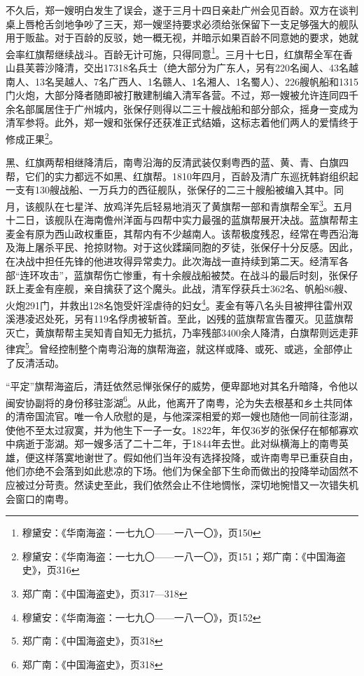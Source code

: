 不久后，郑一嫂明白发生了误会，遂于三月十四日亲赴广州会见百龄。双方在谈判桌上唇枪舌剑地争吵了三天，郑一嫂坚持要求必须给张保留下一支足够强大的舰队用于贩盐。对于百龄的反驳，她一概无视，并暗示如果百龄不同意她的要求，她就会率红旗帮继续战斗。百龄无计可施，只得同意\footnote{穆黛安：《华南海盗：一七九〇——一八一〇》，页150}。三月十七日，红旗帮全军在香山县芙蓉沙降清，交出17318名兵士（绝大部分为广东人，另有220名闽人、43名越南人、13名吴越人、7名广西人、1名赣人、1名湘人、1名蜀人）、226艘帆船和1315门火炮，大部分降者随即被打散建制编入清军各营。不过，郑一嫂被允许连同四千余名部属居住于广州城内，张保仔则得以二三十艘战船和部分部众，摇身一变成为清军参将。此外，郑一嫂和张保仔还获准正式结婚，这标志着他们两人的爱情终于修成正果\footnote{穆黛安：《华南海盗：一七九〇——一八一〇》，页151；郑广南：《中国海盗史》，页316}。

黑、红旗两帮相继降清后，南粤沿海的反清武装仅剩粤西的蓝、黄、青、白旗四帮，它们的实力都远不如黑、红旗帮。1810年四月，百龄及清广东巡抚韩崶组织起一支有130艘战船、一万兵力的西征舰队，张保仔的二三十艘船被编入其中。同月，该舰队在七星洋、放鸡洋先后轻易地消灭了黄旗帮一部和青旗帮全军\footnote{郑广南：《中国海盗史》，页317—318}。五月十二日，该舰队在海南儋州洋面与四帮中实力最强的蓝旗帮展开决战。蓝旗帮帮主麦金有原为西山政权重臣，其帮内有不少越南人。该帮极度残忍，经常在粤西沿海及海上屠杀平民、抢掠财物。对于这伙蹂躏同胞的歹徒，张保仔十分反感。因此，在决战中担任先锋的他进攻得异常卖力。此次海战一直持续到第二天。经清军各部“连环攻击”，蓝旗帮伤亡惨重，有十余艘战船被焚。在战斗的最后时刻，张保仔跃上麦金有座舰，亲自擒获了这个魔头。此战，清军俘获兵士362名、帆船86艘、火炮291门，并救出128名饱受奸淫虐待的妇女\footnote{穆黛安：《华南海盗：一七九〇——一八一〇》，页152}。麦金有等八名头目被押往雷州双溪港凌迟处死，另有119名俘虏被斩首。至此，凶残的蓝旗帮宣告覆灭。见蓝旗帮灭亡，黄旗帮帮主吴知青自知无力抵抗，乃率残部3400余人降清，白旗帮则远走菲律宾\footnote{郑广南：《中国海盗史》，页318}。曾经控制整个南粤沿海的旗帮海盗，就这样或降、或死、或逃，全部停止了反清活动。

“平定”旗帮海盗后，清廷依然忌惮张保仔的威势，便卑鄙地对其名升暗降，令他以闽安协副将的身份移驻澎湖\footnote{郑广南：《中国海盗史》，页318}。从此，他离开了南粤，沦为失去根基和乡土共同体的清帝国流官。唯一令人欣慰的是，与他深深相爱的郑一嫂也随他一同前往澎湖，使他不至太过寂寞，并为他生下一子一女。1822年，年仅36岁的张保仔在郁郁寡欢中病逝于澎湖。郑一嫂多活了二十二年，于1844年去世。此对纵横海上的南粤英雄，便这样落寞地谢世了。假如他们当年没有选择投降，或许南粤早已重获自由，他们亦绝不会落到如此悲凉的下场。他们为保全部下生命而做出的投降举动固然不应被过分苛责。然读史至此，我们依然会止不住地惆怅，深切地惋惜又一次错失机会窗口的南粤。

